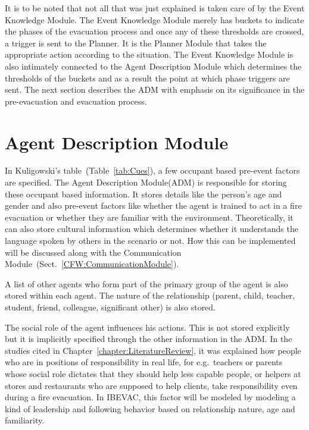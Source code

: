 It is to be noted that not all that was just explained is taken care of by the Event Knowledge Module. The Event Knowledge Module merely has buckets to indicate the phases of the evacuation process and once any of these thresholds are crossed, a trigger is sent to the Planner. It is the Planner Module that takes the appropriate action according to the situation. The Event Knowledge Module is also intimately connected to the Agent Description Module which determines the thresholds of the buckets and as a result the point at which phase triggers are sent. The next section describes the ADM with emphasis on its significance in the pre-evacuation and evacuation process.

\section{Agent Description Module}
\label{CFW:ADM}

In Kuligowski's table~(Table~\ref{tab:Cues}), a few occupant based pre-event factors are specified. The Agent Description Module(ADM) is responsible for storing these occupant based information. It stores details like the person's age and gender and also pre-event factors like whether the agent is trained to act in a fire evacuation or whether they are familiar with the environment. Theoretically, it can also store cultural information which determines whether it understands the language spoken by others in the scenario or not. How this can be implemented will be discussed along with the Communication Module~(Sect.~\ref{CFW:CommunicationModule}).

A list of other agents who form part of the primary group of the agent is also stored within each agent. The nature of the relationship (parent, child, teacher, student, friend, colleague, significant other) is also stored.

The social role of the agent influences his actions. This is not stored explicitly but it is implicitly specified through the other information in the ADM. In the studies cited in Chapter~\ref{chapter:LiteratureReview}, it was explained how people who are in positions of responsibility in real life, for e.g.\ teachers or parents whose social role dictates that they should help less capable people, or helpers at stores and restaurants who are supposed to help clients, take responsibility even during a fire evacuation. In IBEVAC, this factor will be modeled by modeling a kind of leadership and following behavior based on relationship nature, age and familiarity.


